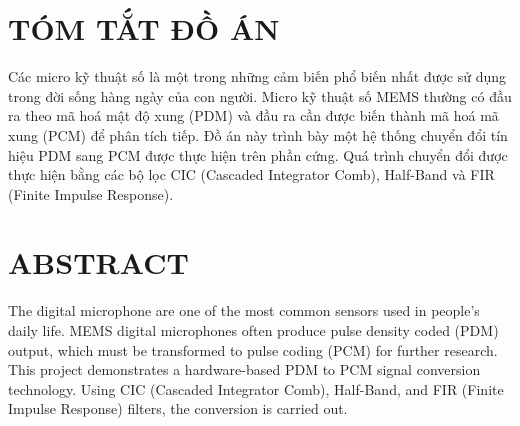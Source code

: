 \section*{TÓM TẮT ĐỒ ÁN}
Các micro kỹ thuật số là một trong những cảm biến phổ biến nhất được sử dụng trong đời sống hàng ngày của con người. Micro kỹ thuật số MEMS thường có đầu ra theo mã hoá mật độ xung (PDM) và đầu ra cần được biến thành mã hoá mã xung (PCM) để phân tích tiếp. Đồ án này trình bày một hệ thống chuyển đổi tín hiệu PDM sang PCM được thực hiện trên phần cứng. Quá trình chuyển đổi được thực hiện bằng các bộ lọc CIC (Cascaded Integrator Comb), Half-Band và FIR (Finite Impulse Response).
\newpage

\section*{ABSTRACT}
The digital microphone are one of the most common sensors used in people's daily life. MEMS digital microphones often produce pulse density coded (PDM) output, which must be transformed to pulse coding (PCM) for further research. This project demonstrates a hardware-based PDM to PCM signal conversion technology. Using CIC (Cascaded Integrator Comb), Half-Band, and FIR (Finite Impulse Response) filters, the conversion is carried out.
\newpage